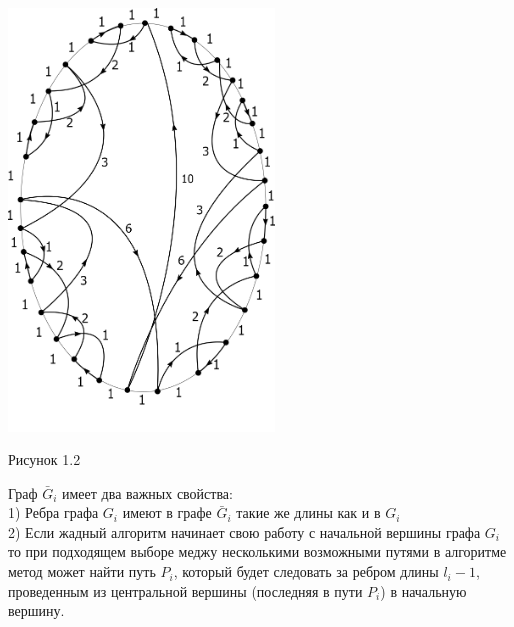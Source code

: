 \documentclass[a4paper, 14pt]{extarticle}
\begin{document}
\begin{center}
\includegraphics[width=200pt]{ris2.png}
\end{center}

\begin{center}
Рисунок 1.2
\end{center}


Граф $\bar G_i$ имеет два важных свойства:\\
1) Ребра графа $G_i$ имеют в графе $\bar G_i$ такие же длины как и в $G_i$ \\
2) Если жадный алгоритм начинает свою работу с начальной вершины графа  $G_i$ то при подходящем выборе меджу несколькими возможными путями в алгоритме метод может найти путь $P_i$, который будет следовать за ребром длины $l_i-1$, проведенным из центральной вершины (последняя в пути $P_i$) в начальную вершину.
\end{document}
